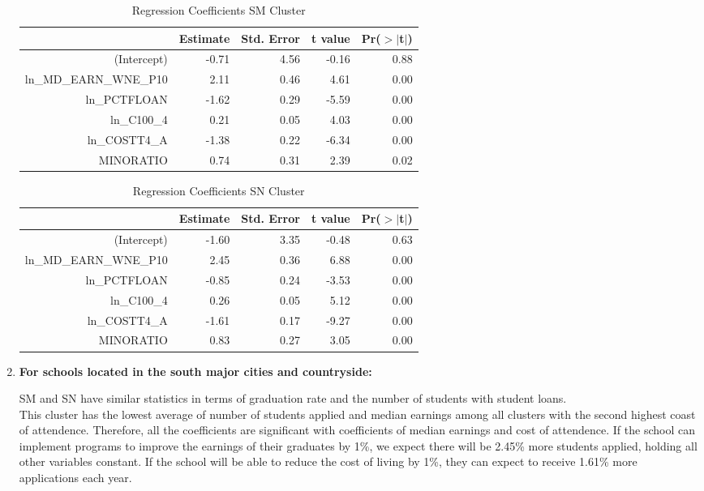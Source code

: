 \documentclass{article}
\begin{document}
\begin{enumerate}
\begin{table}[H]
\centering
\begin{tabular}{rrrrr}
  \hline
 & Estimate & Std. Error & t value & Pr($>$$|$t$|$) \\ 
  \hline
(Intercept) & -0.71 & 4.56 & -0.16 & 0.88 \\ 
  ln\_MD\_EARN\_WNE\_P10 & 2.11 & 0.46 & 4.61 & 0.00 \\ 
  ln\_PCTFLOAN & -1.62 & 0.29 & -5.59 & 0.00 \\ 
  ln\_C100\_4 & 0.21 & 0.05 & 4.03 & 0.00 \\ 
  ln\_COSTT4\_A & -1.38 & 0.22 & -6.34 & 0.00 \\ 
  MINORATIO & 0.74 & 0.31 & 2.39 & 0.02 \\ 
   \hline
\end{tabular}
\caption{Regression Coefficients SM Cluster} 
\end{table}\begin{table}[H]
\centering
\begin{tabular}{rrrrr}
  \hline
 & Estimate & Std. Error & t value & Pr($>$$|$t$|$) \\ 
  \hline
(Intercept) & -1.60 & 3.35 & -0.48 & 0.63 \\ 
  ln\_MD\_EARN\_WNE\_P10 & 2.45 & 0.36 & 6.88 & 0.00 \\ 
  ln\_PCTFLOAN & -0.85 & 0.24 & -3.53 & 0.00 \\ 
  ln\_C100\_4 & 0.26 & 0.05 & 5.12 & 0.00 \\ 
  ln\_COSTT4\_A & -1.61 & 0.17 & -9.27 & 0.00 \\ 
  MINORATIO & 0.83 & 0.27 & 3.05 & 0.00 \\ 
   \hline
\end{tabular}
\caption{Regression Coefficients SN Cluster} 
\end{table}  
\item\textbf{For schools located in the south major cities and countryside:}
  
SM and SN have similar statistics in terms of graduation rate and the number of students with student loans.\\

This cluster has the lowest average of number of students applied and median earnings among all clusters with the second highest coast of attendence. Therefore, all the coefficients are significant with coefficients of median earnings and cost of attendence. If the school can implement programs to improve the earnings of their graduates by 1\%, we expect there will be 2.45\% more students applied, holding all other variables constant. If the school will be able to reduce the cost of living by 1\%, they can expect to receive 1.61\% more applications each year.\\
\end{enumerate}
\end{document}
